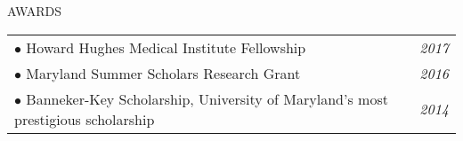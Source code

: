 \documentclass{resume} %
\begin{document}




\begin{rSection}{AWARDS}


\begin{tabular}{p{14cm}R{2.5cm}}
$\bullet$ Howard Hughes Medical Institute Fellowship  &  \it{2017}  \\ 
$\bullet$ Maryland Summer Scholars Research Grant  & \it{2016}  \\ 
$\bullet$ Banneker-Key Scholarship, University of Maryland's most prestigious scholarship & \it{2014}
\end{tabular} 


\end{rSection}
\end{document}
